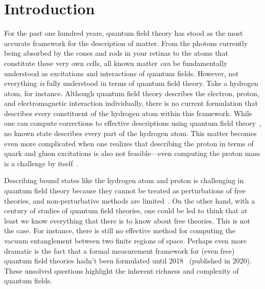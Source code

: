 \documentclass[letterpaper,12pt,titlepage,oneside,final]{book}
\begin{document}
 

%

\chapter*{Introduction}\label{chap:Intro}


For the past one hundred years, quantum field theory has stood as the most accurate framework for the description of matter. From the photons currently being absorbed by the cones and rods in your retinas to the atoms that constitute these very own cells, all known matter \textit{can} be fundamentally understood as excitations and interactions of quantum fields. However, not everything \textit{is} fully understood in terms of quantum field theory. Take a hydrogen atom, for instance. Although quantum field theory describes the electron, proton, and electromagnetic interaction individually, there is no current formulation that describes every constituent of the hydrogen atom within this framework. While one can compute corrections to effective descriptions using quantum field theory~\cite{gfactorBeier2000,gfactorIndelicato2004,gfactorTwoLoop2013,gfactor2020,gfactorExp2023}, no known state describes every part of the hydrogen atom. This matter becomes even more complicated when one realizes that describing the proton in terms of quark and gluon excitations is also not feasible---even computing the proton mass is a challenge by itself~\cite{QCD}.


Describing bound states like the hydrogen atom and proton is challenging in quantum field theory because they cannot be treated as perturbations of free theories, and non-perturbative methods are limited~\cite{nonpertComment2004,nonpertComment2021}. On the other hand, with a century of studies of quantum field theories, one could be led to think that at least we know everything that there is to know about free theories. This is not the case. For instance, there is still no effective method for computing the vacuum entanglement between two finite regions of space. Perhaps even more dramatic is the fact that a formal measurement framework for (even free) quantum field theories hadn't been formulated until 2018~\cite{FVOG} (published in 2020). These unsolved questions highlight the inherent richness and complexity of quantum fields.
\end{document}
